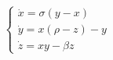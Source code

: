 \[
\begin{cases}
  \dot{x} = \sigma(y - x) \\
  \dot{y} = x(\rho - z) - y \\
  \dot{z} = xy - \beta z
\end{cases}
\]
